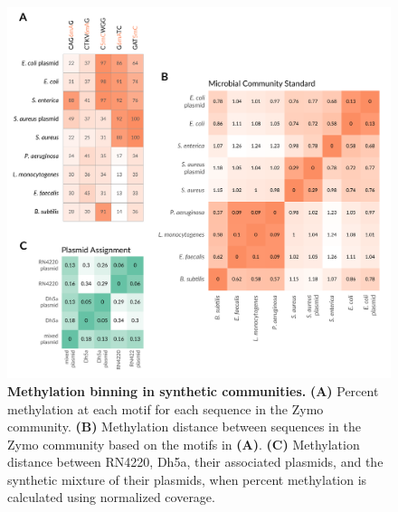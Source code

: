 \begin{figure}[!hb]
\centering
\includegraphics[width = 1\linewidth,keepaspectratio]{figure/controls.pdf}
\caption[Methylation binning in synthetic communities]{{\bf Methylation binning in synthetic communities.} {\bf (A)} Percent methylation at each motif for each sequence in the Zymo community. {\bf (B)} Methylation distance between sequences in the Zymo community based on the motifs in {\bf (A)}. {\bf (C)} Methylation distance between RN4220, Dh5a, their associated plasmids, and the synthetic mixture of their plasmids, when percent methylation is calculated using normalized coverage. }
\label{fig:controls}
\end{figure}



